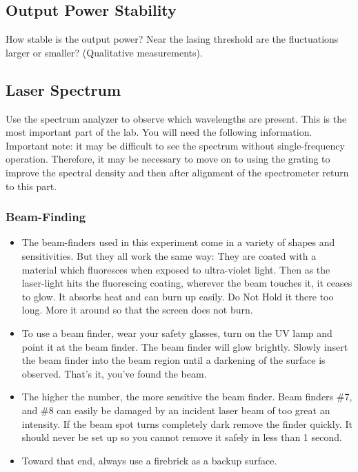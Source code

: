 \documentclass{../lab}
\begin{document}
\subsection{Output Power Stability}

How stable is the output power? Near the lasing threshold are the fluctuations larger or smaller? (Qualitative measurements).

\subsection{Laser Spectrum}

Use the spectrum analyzer to observe which wavelengths are present. This is the most important part of the lab. You will need the following information. Important note: it may be difficult to see the spectrum without single-frequency operation. Therefore, it may be necessary to move on to using the grating to improve the spectral density and then after alignment of the spectrometer return to this part.

\subsubsection{Beam-Finding}

\begin{itemize}
    \item The beam-finders used in this experiment come in a variety of shapes and sensitivities. But they all work the same way: They are coated with a material which fluoresces when exposed to ultra-violet light. Then as the laser-light hits the fluorescing coating, wherever the beam touches it, it ceases to glow. It absorbs heat and can burn up easily. Do Not Hold it there too long. More it around so that the screen does not burn.

    \item To use a beam finder, wear your safety glasses, turn on the UV lamp and point it at the beam finder. The beam finder will glow brightly. Slowly insert the beam finder into the beam region until a darkening of the surface is observed. That's it, you've found the beam.

    \item The higher the number, the more sensitive the beam finder. Beam finders \#7, and \#8 can easily be damaged by an incident laser beam of too great an intensity. If the beam spot turns completely dark remove the finder quickly. It should never be set up so you cannot remove it safely in less than 1 second.

    \item Toward that end, always use a firebrick as a backup surface.
\end{itemize}
\end{document}
